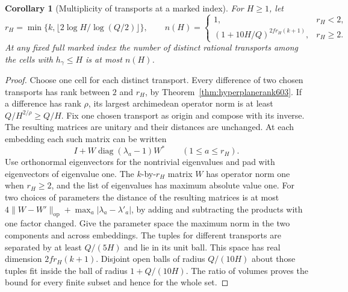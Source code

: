 \documentclass[a4paper,11pt]{article}
\newtheorem{corollary}[proposition]{Corollary}
\theoremstyle{definition}
\theoremstyle{remark}
\numberwithin{equation}{section}
\begin{document}
\begin{corollary}[Multiplicity of transports at a marked index]
\leavevmode\label{cor:rankpacking603}
For \(H\ge1\), let
\[
   r_H=\min\{k,\lfloor 2\log H/\log(Q/2)\rfloor\},\qquad
   n(H)=
   \begin{cases}
      1,&r_H<2,\\
      (1+10H/Q)^{2fr_H(k+1)},&r_H\ge2 .
   \end{cases}
\]
At any fixed full marked index the number of distinct rational
transports among the cells with \(h_\gamma\le H\) is at most
\(n(H)\).
\end{corollary}
\begin{proof}
Choose one cell for each distinct transport. Every difference
of two chosen transports has rank between \(2\) and \(r_H\),
by Theorem~\ref{thm:hyperplanerank603}. If a difference has
rank \(\rho\), its largest archimedean operator norm is at
least \(Q/H^{2/\rho}\ge Q/H\). Fix one chosen transport as
origin and compose with its inverse. The resulting matrices
are unitary and their distances are unchanged. At each
embedding each such matrix can be written
\[
                  I+W\operatorname{diag}(\lambda_a-1)W^*
                     \qquad(1\le a\le r_H).
\]
Use orthonormal eigenvectors for the nontrivial eigenvalues
and pad with eigenvectors of eigenvalue one. The \(k\)-by-\(r_H\)
matrix \(W\) has operator norm one when \(r_H\ge2\), and the
list of eigenvalues has maximum absolute value one. For two
choices of parameters the distance of the resulting matrices
is at most \(4\|W-W'\|_{\mathrm{op}}+
\max_a|\lambda_a-\lambda'_a|\), by adding and subtracting
the products with one factor changed. Give the parameter
space the maximum norm in the two components and across
embeddings. The tuples for different transports are separated
by at least \(Q/(5H)\) and lie in its unit ball. This space
has real dimension \(2fr_H(k+1)\). Disjoint open balls of
radius \(Q/(10H)\) about those tuples fit inside the ball of
radius \(1+Q/(10H)\). The ratio of volumes proves the bound
for every finite subset and hence for the whole set.
\end{proof}
\end{document}
